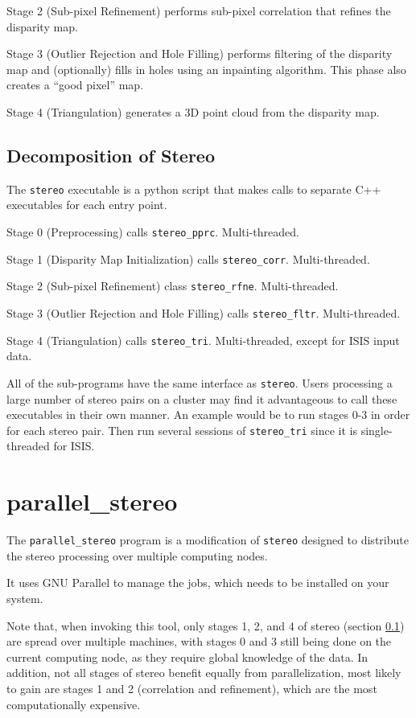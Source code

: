 Stage 2 (Sub-pixel Refinement) performs sub-pixel correlation that
refines the disparity map.

Stage 3 (Outlier Rejection and Hole Filling) performs filtering of the
disparity map and (optionally) fills in holes using an inpainting
algorithm.  This phase also creates a ``good pixel'' map.

Stage 4 (Triangulation) generates a 3D point cloud from the disparity
map.

\subsection{Decomposition of Stereo}
\label{stereo_dec}

The \texttt{stereo}
executable is a python script that makes calls to separate
C++ executables for each entry point.

Stage 0 (Preprocessing) calls \texttt{stereo\_pprc}. Multi-threaded.

Stage 1 (Disparity Map Initialization) calls
\texttt{stereo\_corr}. Multi-threaded.

Stage 2 (Sub-pixel Refinement) class \texttt{stereo\_rfne}. Multi-threaded.

Stage 3 (Outlier Rejection and Hole Filling) calls
\texttt{stereo\_fltr}. Multi-threaded.

Stage 4 (Triangulation) calls \texttt{stereo\_tri}. Multi-threaded,
except for ISIS input data.

All of the sub-programs have the same interface as
\texttt{stereo}. Users processing a large number of stereo pairs on a
cluster may find it advantageous to call these executables in their own
manner. An example would be to run stages 0-3 in order for each stereo
pair. Then run several sessions of \texttt{stereo\_tri} since it is
single-threaded for ISIS.

\section{parallel\_stereo}
\label{parallel}

The \texttt{parallel\_stereo} program is a modification of \texttt{stereo}
designed to distribute the stereo processing over multiple computing
nodes.

It uses GNU Parallel to manage the jobs, which needs to be installed
on your system.

Note that, when invoking this tool, only stages 1, 2, and 4 of
stereo (section \ref{stereo_dec}) are spread over multiple machines,
with stages 0 and 3 still being done on the current computing node, as
they require global knowledge of the data. In addition, not all stages
of stereo benefit equally from parallelization, most likely to gain
are stages 1 and 2 (correlation and refinement), which are the most
computationally expensive.

